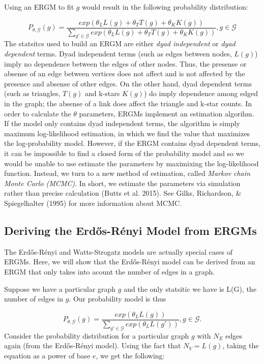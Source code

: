 \documentclass[12pt,twoside]{amherstthesis}
\begin{document}
  Using an ERGM to fit \(g\) would result in the following probability
  distribution:
  
  \[P_{\theta, \mathcal{G}}(g) = \frac {exp(\theta_{L}L(g) + \theta_{T}T(g)+\theta_{K}K(g))} {\sum_{g' \in \mathcal{G}}^{} exp(\theta_{L}L(g) + \theta_{T}T(g)+\theta_{K}K(g))}, g \in \mathcal{G} \]
  The statsitcs used to build an ERGM are either \emph{dyad independent}
  or \emph{dyad dependent} terms. Dyad independent terms (such as edges
  between nodes, \(L(g)\)) imply no dependence between the edges of other
  nodes. Thus, the presense or absense of an edge between vertices does
  not affect and is not affected by the presence and absense of other
  edges. On the other hand, dyad dependent terms (such as triangles,
  \(T(g)\) and k-stars \(K(g)\)) do imply dependence among edged in the
  graph; the absense of a link does affect the triangle and k-star counts.
  In order to calculate the \(\theta\) parameters, ERGMs implement an
  estimation algorihm. If the model only contains dyad independent terms,
  the algorithm is simply maximum log-likelihood estimation, in which we
  find the value that maximizes the log-probability model. However, if the
  ERGM contains dyad dependent terms, it can be impossible to find a
  closed form of the probability model and so we would be unable to use
  estimate the parameters by maximixing the log-likelihood function.
  Instead, we turn to a new method of estimation, called \emph{Markov
  chain Monte Carlo (MCMC)}. In short, we estimate the parameters via
  simulation rather than precise calculation (Butts et al. 2015). See
  Gilks, Richardson, \& Spiegelhalter (1995) for more information about
  MCMC.
  
  \subsection{Deriving the Erdős-Rényi Model from
  ERGMs}\label{deriving-the-erdos-renyi-model-from-ergms}
  
  The Erdős-Rényi and Watts-Strogatz models are actually special cases of
  ERGMs. Here, we will show that the Erdős-Rényi model can be derived from
  an ERGM that only takes into acount the number of edges in a graph.
  
  Suppose we have a particular graph \(g\) and the only statsitic we have
  is L(G), the number of edges in \(g\). Our probability model is thus
  
  \[P_{\theta, \mathcal{G}}(g) = \frac {exp(\theta_{L}L(g))} {\sum_{g' \in \mathcal{G}}^{} exp(\theta_{L}L(g'))}, g \in \mathcal{G}.\]
  Consider the probability distribution for a particular graph \(g\) with
  \(N_E\) edges again (from the Erdős-Rényi model). Using the fact that
  \(N_{V} = L(g)\), taking the equation as a power of base \(e\), we get
  the following:
  
\end{document}
